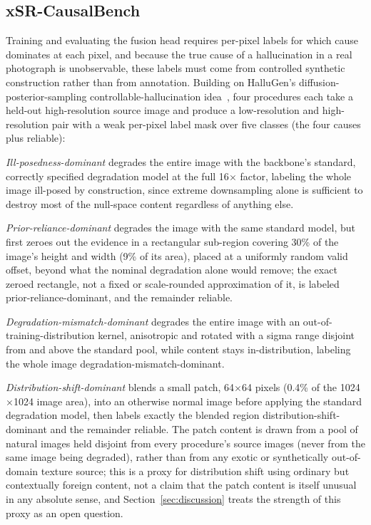 \documentclass[review]{elsarticle}
\begin{document}
\subsection{xSR-CausalBench}
\label{sec:causalbench}

Training and evaluating the fusion head requires per-pixel labels for which cause dominates at each pixel, and because the true cause of a hallucination in a real photograph is unobservable, these labels must come from controlled synthetic construction rather than from annotation. Building on HalluGen's diffusion-posterior-sampling controllable-hallucination idea~\citep{kim2025hallugen}, four procedures each take a held-out high-resolution source image and produce a low-resolution and high-resolution pair with a weak per-pixel label mask over five classes (the four causes plus reliable):

\emph{Ill-posedness-dominant} degrades the entire image with the backbone's standard, correctly specified degradation model at the full 16$\times$ factor, labeling the whole image ill-posed by construction, since extreme downsampling alone is sufficient to destroy most of the null-space content regardless of anything else.

\emph{Prior-reliance-dominant} degrades the image with the same standard model, but first zeroes out the evidence in a rectangular sub-region covering 30\% of the image's height and width (9\% of its area), placed at a uniformly random valid offset, beyond what the nominal degradation alone would remove; the exact zeroed rectangle, not a fixed or scale-rounded approximation of it, is labeled prior-reliance-dominant, and the remainder reliable.

\emph{Degradation-mismatch-dominant} degrades the entire image with an out-of-training-distribution kernel, anisotropic and rotated with a sigma range disjoint from and above the standard pool, while content stays in-distribution, labeling the whole image degradation-mismatch-dominant.

\emph{Distribution-shift-dominant} blends a small patch, 64$\times$64 pixels (0.4\% of the 1024$\times$1024 image area), into an otherwise normal image before applying the standard degradation model, then labels exactly the blended region distribution-shift-dominant and the remainder reliable. The patch content is drawn from a pool of natural images held disjoint from every procedure's source images (never from the same image being degraded), rather than from any exotic or synthetically out-of-domain texture source; this is a proxy for distribution shift using ordinary but contextually foreign content, not a claim that the patch content is itself unusual in any absolute sense, and Section~\ref{sec:discussion} treats the strength of this proxy as an open question.
\end{document}

